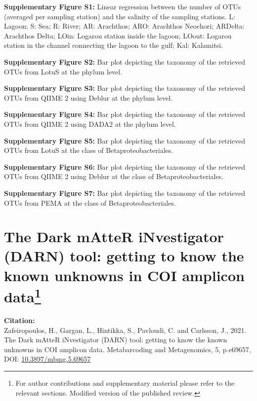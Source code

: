 \textbf{Supplementary Figure S1:} Linear regression between the number of OTUs (averaged per sampling station) and the salinity of the sampling stations. L: Lagoon; S: Sea; R: River; AR: Arachthos; ARO: Arachthos Neochori; ARDelta: Arachthos Delta; LOin: Logarou station inside the lagoon; LOout: Logarou station in the channel connecting the lagoon to the gulf; Kal: Kalamitsi.

\textbf{Supplementary Figure S2:} Bar plot depicting the taxonomy of the retrieved OTUs from LotuS at the phylum level.

\textbf{Supplementary Figure S3:} Bar plot depicting the taxonomy of the retrieved OTUs from QIIME 2 using Deblur at the phylum level.

\textbf{Supplementary Figure S4:} Bar plot depicting the taxonomy of the retrieved OTUs from QIIME 2 using DADA2 at the phylum level.

\textbf{Supplementary Figure S5:} Bar plot depicting the taxonomy of the retrieved OTUs from LotuS at the class of Betaproteobacteriales.

\textbf{Supplementary Figure S6:} Bar plot depicting the taxonomy of the retrieved OTUs from QIIME 2 using Deblur at the class of Betaproteobacteriales.

\textbf{Supplementary Figure S7:} Bar plot depicting the taxonomy of the retrieved OTUs from PEMA at the class of Betaproteobacteriales.

\newpage


% 
% 

\newpage

\section[The Dark mAtteR iNvestigator (DARN) tool: getting to know the known unknowns in COI amplicon data]{
      The Dark mAtteR iNvestigator (DARN) tool: getting to know the known unknowns in COI amplicon data\footnote{
      For author contributions and supplementary material please refer to the relevant sections. 
      Modified version of the published review.
   }
}

\textbf{Citation:} \\
Zafeiropoulos, H., Gargan, L., Hintikka, S., Pavloudi, C. and Carlsson, J., 2021. The Dark mAtteR iNvestigator (DARN) tool: getting to know the known unknowns in COI amplicon data. Metabarcoding and Metagenomics, 5, p.e69657, \\
DOI: \href{https://doi.org/10.3897/mbmg.5.69657}{10.3897/mbmg.5.69657}

